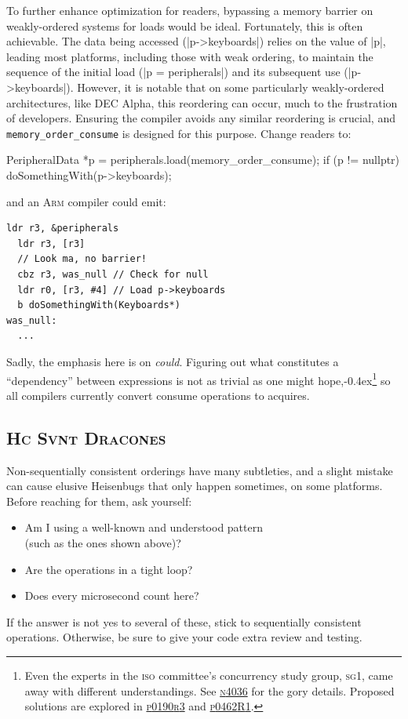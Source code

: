 \documentclass[fontsize=10pt, oneside]{scrartcl}
\newcommand{\punckern}{\kern-0.4ex}
\newcommand{\monobox}[1]{\mbox{\texttt{#1}}}
\begin{document}
To further enhance optimization for readers,
bypassing a memory barrier on weakly-ordered systems for loads would be ideal.
Fortunately, this is often achievable.
The data being accessed (\cpp|p->keyboards|) relies on the value of \cpp|p|,
leading most platforms, including those with weak ordering,
to maintain the sequence of the initial load (\cpp|p = peripherals|) and its subsequent use (\cpp|p->keyboards|).
However, it is notable that on some particularly weakly-ordered architectures, like DEC Alpha,
this reordering can occur, much to the frustration of developers.
Ensuring the compiler avoids any similar reordering is crucial, and \monobox{memory\_order\_consume} is designed for this purpose.
Change readers to:
\begin{cppcode}
PeripheralData *p = peripherals.load(memory_order_consume);
if (p != nullptr) {
    doSomethingWith(p->keyboards);
}
\end{cppcode}
and an \textsc{Arm} compiler could emit:
\begin{lstlisting}[language={[ARM]Assembler}]
  ldr r3, &peripherals
  ldr r3, [r3]
  // Look ma, no barrier!
  cbz r3, was_null // Check for null
  ldr r0, [r3, #4] // Load p->keyboards
  b doSomethingWith(Keyboards*)
was_null:
  ...
\end{lstlisting}

\setcounter{footnote}{0}
Sadly, the emphasis here is on \emph{could}.
Figuring out what constitutes a ``dependency'' between expressions is not as trivial as one might hope,\punckern\footnote{Even the experts in
the \textsc{iso} committee's concurrency study group, \textsc{sg}1,
came away with different understandings.
See
\href{https://www.open-std.org/jtc1/sc22/wg21/docs/papers/2014/n4036.pdf}{\textsc{n}4036}
for the gory details.
Proposed solutions are explored in
\href{https://www.open-std.org/jtc1/sc22/wg21/docs/papers/2017/p0190r3.pdf}{\textsc{p}0190\textsc{r}3}
and
\href{https://www.open-std.org/jtc1/sc22/wg21/docs/papers/2017/p0462r1.pdf}{\textsc{p}0462\textsc{R}1}.
}
so all compilers currently convert consume operations to acquires.

\subsection{\textup{\textsc{Hc Svnt Dracones}}}

Non-sequentially consistent orderings have many subtleties,
and a slight mistake can cause elusive Heisenbugs that only happen sometimes,
on some platforms.
Before reaching for them, ask yourself:
\begin{itemize}[label={}, before=\itshape]
\item Am I using a well-known and understood pattern \\
      (such as the ones shown above)?
\item Are the operations in a tight loop?
\item Does every microsecond count here?
\end{itemize}
If the answer is not yes to several of these,
stick to sequentially consistent operations.
Otherwise, be sure to give your code extra review and testing.
\end{document}
